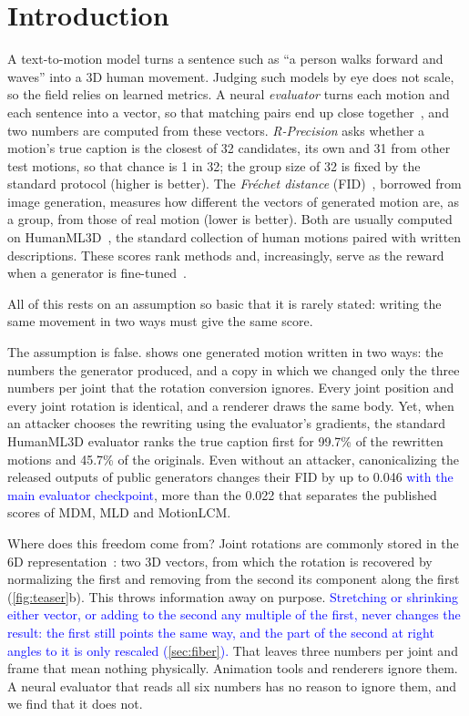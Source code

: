 \documentclass[10pt,twocolumn,letterpaper]{article}
\newcommand{\new}[1]{\textcolor{blue}{#1}}%
\begin{document}
\section{Introduction}
A text-to-motion model turns a sentence such as ``a person walks forward and waves'' into a 3D human movement. Judging such models by eye does not scale, so the field relies on learned metrics. A neural \emph{evaluator} turns each motion and each sentence into a vector, so that matching pairs end up close together~\cite{guo2022,tmr2023}, and two numbers are computed from these vectors. \emph{R-Precision} asks whether a motion's true caption is the closest of 32 candidates, its own and 31 from other test motions, so that chance is 1 in 32; the group size of 32 is fixed by the standard protocol (higher is better). The \emph{Fr\'echet distance} (FID)~\cite{heusel2017}, borrowed from image generation, measures how different the vectors of generated motion are, as a group, from those of real motion (lower is better). Both are usually computed on HumanML3D~\cite{guo2022}, the standard collection of human motions paired with written descriptions. These scores rank methods and, increasingly, serve as the reward when a generator is fine-tuned~\cite{tan2026,motionrft2026}.

All of this rests on an assumption so basic that it is rarely stated: writing the same movement in two ways must give the same score.

The assumption is false.  shows one generated motion written in two ways: the numbers the generator produced, and a copy in which we changed only the three numbers per joint that the rotation conversion ignores. Every joint position and every joint rotation is identical, and a renderer draws the same body. Yet, when an attacker chooses the rewriting using the evaluator's gradients, the standard HumanML3D evaluator ranks the true caption first for 99.7\% of the rewritten motions and 45.7\% of the originals. Even without an attacker, canonicalizing the released outputs of public generators changes their FID by up to 0.046 \new{with the main evaluator checkpoint}, more than the 0.022 that separates the published scores of MDM, MLD and MotionLCM.

Where does this freedom come from? Joint rotations are commonly stored in the 6D representation~\cite{zhou2019}: two 3D vectors, from which the rotation is recovered by normalizing the first and removing from the second its component along the first (\cref{fig:teaser}b). This throws information away on purpose. \new{Stretching or shrinking either vector, or adding to the second any multiple of the first, never changes the result: the first still points the same way, and the part of the second at right angles to it is only rescaled (\cref{sec:fiber}).} That leaves three numbers per joint and frame that mean nothing physically. Animation tools and renderers ignore them. A neural evaluator that reads all six numbers has no reason to ignore them, and we find that it does not.
\end{document}
